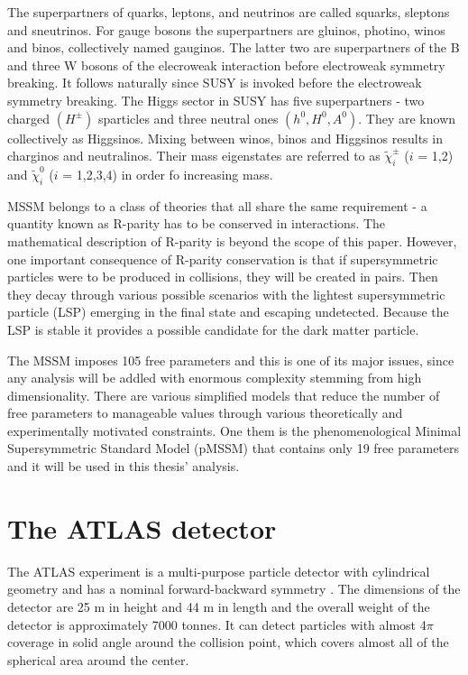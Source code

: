 The superpartners of quarks, leptons, and neutrinos are called squarks, sleptons and sneutrinos. For gauge bosons the superpartners are  gluinos, photino, winos and binos, collectively named gauginos. The latter two are superpartners of the  B and three W bosons of the elecroweak interaction before electroweak symmetry breaking. It follows naturally since SUSY is invoked before the electroweak symmetry breaking. The Higgs sector in SUSY has five superpartners  - two charged $(H^{\pm})$ sparticles and three neutral ones $(h^0, H^0, A^0)$. They are known collectively as Higgsinos. Mixing between winos, binos and Higgsinos results in charginos and neutralinos. Their mass eigenstates are referred to as $\tilde{\chi}^{\pm}_{i}$ ($i$ = 1,2) and $\tilde{\chi}^{0}_{i}$ ($i$ = 1,2,3,4) in order fo increasing mass. 

MSSM belongs to a class of theories that all share the same requirement - a quantity known as R-parity has to be conserved in interactions. The mathematical description of R-parity is beyond the scope of this paper. However, one important consequence of R-parity conservation is that if supersymmetric particles were to be produced in collisions, they will be created in pairs. Then they decay through various possible scenarios with the lightest supersymmetric particle (LSP) emerging in the final state and escaping undetected. Because the LSP is stable it provides a possible candidate for the dark matter particle.

The MSSM imposes 105 free parameters and this is one of its major issues, since any analysis will be addled with enormous complexity stemming from high dimensionality. There are various simplified models that reduce the number of free parameters to manageable values through various theoretically and experimentally motivated constraints. One them is the phenomenological Minimal Supersymmetric Standard Model (pMSSM) that contains only 19 free parameters and it will be used in this thesis' analysis. 





\section{The ATLAS detector}
\label{sec:atlas}
The ATLAS experiment is a multi-purpose particle detector with cylindrical geometry and has a nominal forward-backward symmetry \citep{aad2008atlas}. The dimensions of the detector are 25 m in height and 44 m in length and the overall weight of the detector is approximately 7000 tonnes.
It can detect particles with almost 4$\pi$ coverage in solid angle around the collision point, which covers almost all of the spherical area around the center. 

